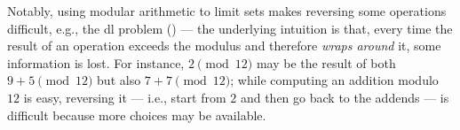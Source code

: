 Notably, using modular arithmetic to limit sets makes reversing some operations difficult, e.g., the \gls{dl} problem () --- the underlying intuition is that, every time the result of an operation exceeds the modulus and therefore \textit{wraps around} it, some information is lost. For instance, $2 \pmod{12}$ may be the result of both $9 + 5 \pmod{12}$ but also $7 + 7 \pmod{12}$; while computing an addition modulo $12$ is easy, reversing it --- i.e., start from $2$ and then go back to the addends --- is difficult because more choices may be available.
